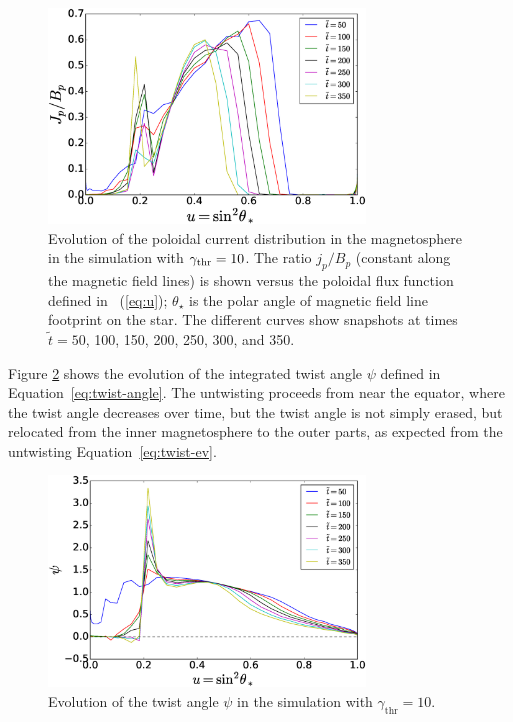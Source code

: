 \begin{figure}[t]
  \centering
  \includegraphics[width=0.75\textwidth]{pics/chap4/j-p.eps}
  \caption[Time evolution of the integrated current in magnetar
  magnetosphere]{Evolution of the poloidal current distribution in the
    magnetosphere in the simulation with $\gamma_{\rm thr}=10$. The ratio $j_p/B_p$
    (constant along the magnetic field lines) is shown versus the poloidal flux
    function defined in \Eq~(\ref{eq:u}); $\theta_\star$ is the polar angle of
    magnetic field line footprint on the star. The different curves show
    snapshots at times $\tilde{t}=50$, 100, 150, 200, 250, 300, and 350.}
  \label{fig:jp}
\end{figure}

Figure \ref{fig:twist} shows the evolution of the integrated twist angle $\psi$
defined in Equation~\eqref{eq:twist-angle}. The untwisting proceeds from near
the equator, where the twist angle decreases over time, but the twist angle is
not simply erased, but relocated from the inner magnetosphere to the outer
parts, as expected from the untwisting Equation~\eqref{eq:twist-ev}.

\begin{figure}[t]
  \centering
  \includegraphics[width=0.75\textwidth]{pics/chap4/twist-evolution.eps}
  \caption[Evolution of the magnetar magnetospheric twist angle]{Evolution of
    the twist angle $\psi$ in the simulation with $\gamma_\mathrm{thr} = 10$. }
  \label{fig:twist}
\end{figure}

